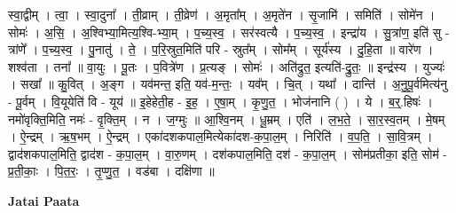 \documentclass[17pt]{extarticle}
\begin{document}
स्वा॒द्वीम् । त्वा॒ । स्वा॒दुना᳚ । ती॒व्राम् । ती॒व्रेण॑ । अ॒मृता᳚म् । अ॒मृते॑न । सृ॒जामि॑ । समिति॑ । सोमे॑न । सोमः॑ । अ॒सि॒ । अ॒श्विभ्या॒मित्य॒श्वि-भ्या॒म् । प॒च्य॒स्व॒ । सर॑स्वत्यै । प॒च्य॒स्व॒ । इन्द्रा॑य । सु॒त्रांण॒ इति॑ सु - त्रांणे᳚ । प॒च्य॒स्व॒ । पु॒नातु॑ । ते॒ । प॒रि॒स्रुत॒मिति॑ परि - स्रुत᳚म् । सोम᳚म् । सूर्य॑स्य । दु॒हि॒ता ॥ वारे॑ण । शश्व॑ता । तना᳚ ॥ वा॒युः । पू॒तः । प॒वित्रे॑ण । प्र॒त्यङ् । सोमः॑ । अति॑द्रुत॒ इत्यति॑-द्रु॒तः॒ ॥ इन्द्र॑स्य । युज्यः॑ । सखा᳚ ॥ कु॒वित् । अ॒ङ्ग । यव॑मन्त॒ इति॒ यव॑-म॒न्तः॒ । यव᳚म् । चि॒त् । यथा᳚ । दान्ति॑ । अ॒नु॒पू॒र्वमित्य॑नु - पू॒र्वम् । वि॒यूयेति॑ वि - यूय॑ ॥ इ॒हेहेती॒ह - इ॒ह॒ । ए॒षा॒म् । कृ॒णु॒त॒ । भोज॑नानि ( ) । ये । ब॒र्॒.हिषः॑ । नमो॑वृक्ति॒मिति॒ नमः॑ - वृ॒क्ति॒म् । न । ज॒ग्मुः ॥ आ॒श्वि॒नम् । धू॒म्रम् । एति॑ । ल॒भ॒ते॒ । सा॒र॒स्व॒तम् । मे॒षम् । ऐ॒न्द्रम् । ऋ॒ष॒भम् । ऐ॒न्द्रम् । एका॑दशकपाल॒मित्येका॑दश-क॒पा॒ल॒म् । निरिति॑ । व॒प॒ति॒ । सा॒वि॒त्रम् । द्वाद॑शकपाल॒मिति॒ द्वाद॑श - क॒पा॒ल॒म् । वा॒रु॒णम् । दश॑कपाल॒मिति॒ दश॑ - क॒पा॒ल॒म् । सोम॑प्रतीका॒ इति॒ सोम॑ - प्र॒ती॒काः॒ । पि॒त॒रः॒ । तृ॒प्णु॒त॒ । वड॑बा । दक्षि॑णा ॥  \newline



\textbf{Jatai Paata} \newline
\end{document}
